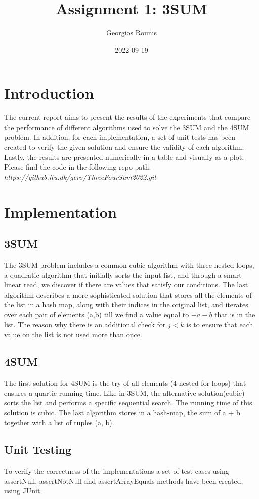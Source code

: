\documentclass[12pt, a4paper]{article}
\title{Assignment 1: 3SUM}
\author{Georgios Rounis}
\date{2022-09-19}
\begin{document}
\maketitle

\section{Introduction}

The current report aims to present the results of the experiments that compare the performance of different algorithms used to solve the 3SUM and the 4SUM problem. In addition, for each implementation, a set of unit tests has been created to verify the given solution and ensure the validity of each algorithm. Lastly, the results are presented numerically in a table and visually as a plot. Please find the code in the following repo path:
\textit{https://github.itu.dk/gero/ThreeFourSum2022.git}

\section{Implementation}
\subsection{3SUM}
The 3SUM problem includes a common cubic algorithm with three nested loops, a quadratic algorithm that initially sorts the input list, and through a smart linear read, we discover if there are values that satisfy our conditions. The last algorithm describes a more sophisticated solution that stores all the elements of the list in a hash map, along with their indices in the original list, and iterates over each pair of elements (a,b) till we find a value equal to $-a - b$ that is in the list. The reason why there is an additional check for $j < k$ is to ensure that each value on the list is not used more than once.

\subsection{4SUM}
The first solution for 4SUM is the try of all elements (4 nested for loops) that ensures a quartic running time. Like in 3SUM, the alternative solution(cubic) sorts the list and performs a specific sequential search. The running time of this solution is cubic. The last algorithm stores in a hash-map, the sum of a + b together with a list of tuples (a, b).

\subsection{Unit Testing}
To verify the correctness of the implementations a set of test cases using assertNull, assertNotNull and assertArrayEquals methods have been created, using JUnit.
\end{document}

